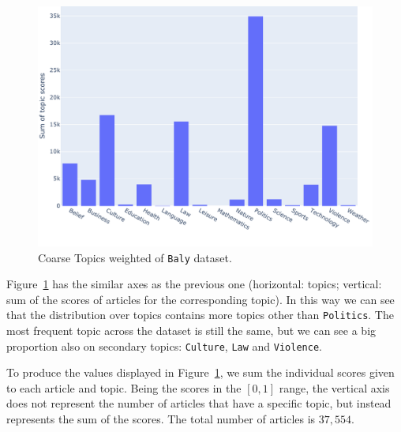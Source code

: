 \begin{figure}[!htbp]
    \centering
    \includegraphics[width=\linewidth]{figures/baly_coarse_weighted.pdf}
    \caption{Coarse Topics weighted of \texttt{Baly} dataset.}
    \label{fig:baly_coarse_weighted}
\end{figure}

Figure~\ref{fig:baly_coarse_weighted} has the similar axes as the previous one (horizontal: topics; vertical: sum of the scores of articles for the corresponding topic).
In this way we can see that the distribution over topics contains more topics other than \texttt{Politics}.
The most frequent topic across the dataset is still the same, but we can see a big proportion also on secondary topics: \texttt{Culture}, \texttt{Law} and \texttt{Violence}.

To produce the values displayed in Figure~\ref{fig:baly_coarse_weighted}, we sum the individual scores given to each article and topic. Being the scores in the $[0,1]$ range, the vertical axis does not represent the number of articles that have a specific topic, but instead represents the sum of the scores. The total number of articles is $37,554$.


